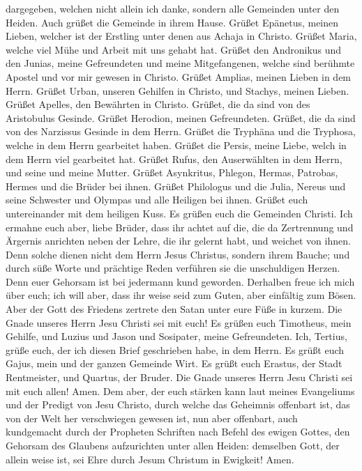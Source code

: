 dargegeben, welchen nicht allein ich danke, sondern alle Gemeinden unter
den Heiden.  Auch grüßet die Gemeinde in ihrem Hause. Grüßet
Epänetus, meinen Lieben, welcher ist der Erstling unter denen aus Achaja
in Christo.  Grüßet Maria, welche viel Mühe und Arbeit mit
uns gehabt hat.  Grüßet den Andronikus und den Junias, meine
Gefreundeten und meine Mitgefangenen, welche sind berühmte Apostel und
vor mir gewesen in Christo.  Grüßet Amplias, meinen Lieben
in dem Herrn.  Grüßet Urban, unseren Gehilfen in Christo,
und Stachys, meinen Lieben.  Grüßet Apelles, den Bewährten
in Christo. Grüßet, die da sind von des Aristobulus Gesinde.
 Grüßet Herodion, meinen Gefreundeten. Grüßet, die da sind
von des Narzissus Gesinde in dem Herrn.  Grüßet die
Tryphäna und die Tryphosa, welche in dem Herrn gearbeitet haben. Grüßet
die Persis, meine Liebe, welch in dem Herrn viel gearbeitet hat.
 Grüßet Rufus, den Auserwählten in dem Herrn, und seine und
meine Mutter.  Grüßet Asynkritus, Phlegon, Hermas,
Patrobas, Hermes und die Brüder bei ihnen.  Grüßet
Philologus und die Julia, Nereus und seine Schwester und Olympas und
alle Heiligen bei ihnen.  Grüßet euch untereinander mit dem
heiligen Kuss. Es grüßen euch die Gemeinden Christi.  Ich
ermahne euch aber, liebe Brüder, dass ihr achtet auf die, die da
Zertrennung und Ärgernis anrichten neben der Lehre, die ihr gelernt
habt, und weichet von ihnen.  Denn solche dienen nicht dem
Herrn Jesus Christus, sondern ihrem Bauche; und durch süße Worte und
prächtige Reden verführen sie die unschuldigen Herzen. 
Denn euer Gehorsam ist bei jedermann kund geworden. Derhalben freue ich
mich über euch; ich will aber, dass ihr weise seid zum Guten, aber
einfältig zum Bösen.  Aber der Gott des Friedens zertrete
den Satan unter eure Füße in kurzem. Die Gnade unseres Herrn Jesu
Christi sei mit euch!  Es grüßen euch Timotheus, mein
Gehilfe, und Luzius und Jason und Sosipater, meine Gefreundeten.
 Ich, Tertius, grüße euch, der ich diesen Brief geschrieben
habe, in dem Herrn.  Es grüßt euch Gajus, mein und der
ganzen Gemeinde Wirt. Es grüßt euch Erastus, der Stadt Rentmeister, und
Quartus, der Bruder.  Die Gnade unseres Herrn Jesu Christi
sei mit euch allen! Amen.  Dem aber, der euch stärken kann
laut meines Evangeliums und der Predigt von Jesu Christo, durch welche
das Geheimnis offenbart ist, das von der Welt her verschwiegen gewesen
ist,  nun aber offenbart, auch kundgemacht durch der
Propheten Schriften nach Befehl des ewigen Gottes, den Gehorsam des
Glaubens aufzurichten unter allen Heiden:  demselben Gott,
der allein weise ist, sei Ehre durch Jesum Christum in Ewigkeit! Amen.
